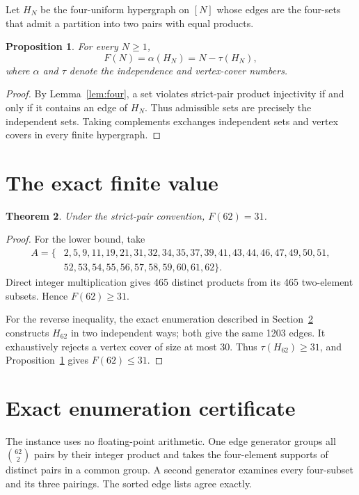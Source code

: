 \documentclass[11pt]{amsart}
\newtheorem{theorem}{Theorem}[section]
\newtheorem{proposition}[theorem]{Proposition}
\theoremstyle{definition}
\begin{document}
Let $H_N$ be the four-uniform hypergraph on $[N]$ whose edges are the
four-sets that admit a partition into two pairs with equal products.
\begin{proposition}\label{prop:reduction}
For every $N\geq1$,
\[
                         F(N)=\alpha(H_N)=N-\tau(H_N),
\]
where $\alpha$ and $\tau$ denote the independence and vertex-cover numbers.
\end{proposition}
\begin{proof}
By Lemma~\ref{lem:four}, a set violates strict-pair product injectivity if and
only if it contains an edge of $H_N$.  Thus admissible sets are precisely the
independent sets.  Taking complements exchanges independent sets and vertex
covers in every finite hypergraph.
\end{proof}

\section{The exact finite value}
\begin{theorem}\label{thm:main}
Under the strict-pair convention, $F(62)=31$.
\end{theorem}
\begin{proof}
For the lower bound, take
\begin{align*}
A=\{&2,5,9,11,19,21,31,32,34,35,37,39,41,43,44,46,47,49,50,51,\\
    &52,53,54,55,56,57,58,59,60,61,62\}.
\end{align*}
Direct integer multiplication gives 465 distinct products from its 465
two-element subsets.  Hence $F(62)\geq31$.

For the reverse inequality, the exact enumeration described in
Section~\ref{sec:certificate} constructs $H_{62}$ in two independent ways;
both give the same 1203 edges.  It exhaustively rejects a vertex cover of size
at most 30.  Thus $\tau(H_{62})\geq31$, and
Proposition~\ref{prop:reduction} gives $F(62)\leq31$.
\end{proof}

\section{Exact enumeration certificate}\label{sec:certificate}
The instance uses no floating-point arithmetic.  One edge generator groups
all $\binom{62}{2}$ pairs by their integer product and takes the four-element
supports of distinct pairs in a common group.  A second generator examines
every four-subset and its three pairings.  The sorted edge lists agree exactly.
\end{document}
